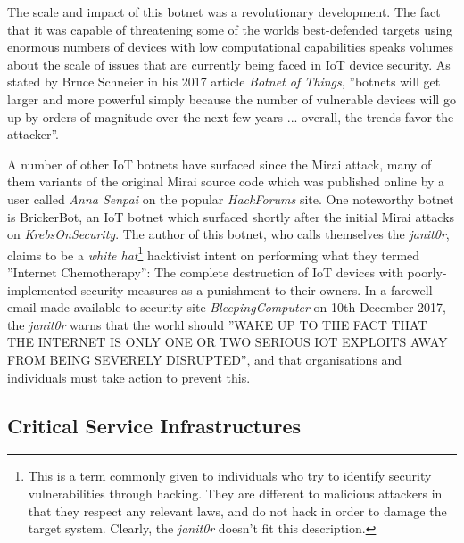 The scale and impact of this botnet was a revolutionary development. The fact that it was capable of threatening some of the worlds best-defended targets using enormous numbers of devices with low computational capabilities speaks volumes about the scale of issues that are currently being faced in IoT device security. As stated by Bruce Schneier in his 2017 article \textit{Botnet of Things}, ''botnets will get larger and more powerful simply because the number of vulnerable devices will go up by orders of magnitude over the next few years ... overall, the trends favor the attacker''. \cite{SchneierBotnetOfThings}

A number of other IoT botnets have surfaced since the Mirai attack, many of them variants of the original Mirai source code which was published online by a user called \textit{Anna Senpai} on the popular \textit{HackForums} site. \cite{WhoIsAnnaSenpaiKrebs} One noteworthy botnet is BrickerBot, an IoT botnet which surfaced shortly after the initial Mirai attacks on \textit{KrebsOnSecurity}. \cite{BrickerBotArticle} The author of this botnet, who calls themselves the \textit{janit0r}, claims to be a \textit{white hat}\footnote{This is a term commonly given to individuals who try to identify security vulnerabilities through hacking. They are different to malicious attackers in that they respect any relevant laws, and do not hack in order to damage the target system. Clearly, the \textit{janit0r} doesn't fit this description.} hacktivist intent on performing what they termed ''Internet Chemotherapy'': The complete destruction of IoT devices with poorly-implemented security measures as a punishment to their owners. In a farewell email made available to security site \textit{BleepingComputer} on 10th December 2017, the \textit{janit0r} warns that the world should ''WAKE UP TO THE FACT THAT THE INTERNET IS ONLY ONE OR TWO SERIOUS IOT EXPLOITS AWAY FROM BEING SEVERELY DISRUPTED'', and that organisations and individuals must take action to prevent this. \cite{janit0rFarewellEmail}


	
\subsection{Critical Service Infrastructures}
	
